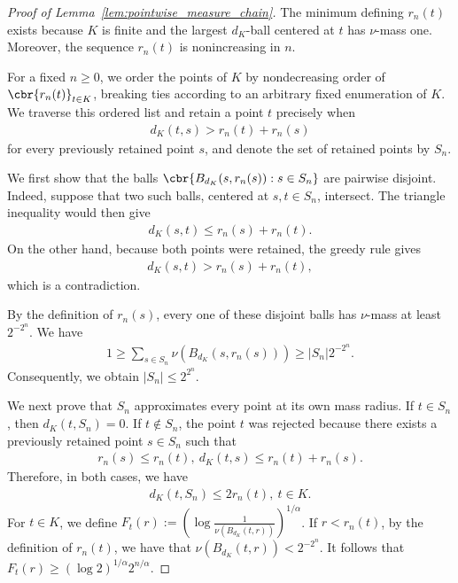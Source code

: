 \documentclass[11pt]{article}
\begin{document}
\begin{proof}[Proof of Lemma~\ref{lem:pointwise_measure_chain}]
The minimum defining $r_n(t)$ exists because $K$ is finite and the
largest $d_K$-ball centered at $t$ has $\nu$-mass one. Moreover, the
sequence $r_n(t)$ is nonincreasing in $n$.

For a fixed $n\ge0$, we order the points of $K$ by nondecreasing order of
$\cbr{r_n(t)}_{t\in K}$, breaking ties according to an arbitrary fixed enumeration of
$K$. We traverse this ordered list and retain a point $t$ precisely
when
\begin{align*}
d_K(t,s)>r_n(t)+r_n(s)
\end{align*}
for every previously retained point $s$, and denote the set of
retained points by $S_n$.

We first show that the balls $\cbr{B_{d_K}(s,r_n(s)):s\in S_n}$ are pairwise disjoint. Indeed, suppose that two such balls, centered at
$s,t\in S_n$, intersect. The triangle inequality would then give
\begin{align*}
d_K(s,t)
\le
r_n(s)+r_n(t).
\end{align*}
On the other hand, because both points were retained, the greedy rule
gives
\begin{align*}
d_K(s,t)>r_n(s)+r_n(t),
\end{align*}
which is a contradiction.

By the definition of $r_n(s)$, every one of these disjoint balls has
$\nu$-mass at least $2^{-2^n}$. We have
\begin{align*}
1\ge
\sum_{s\in S_n}\nu(B_{d_K}(s,r_n(s)))\ge
|S_n|2^{-2^n}.
\end{align*}
Consequently, we obtain $|S_n|\le2^{2^n}$.


We next prove that $S_n$ approximates every point at its own mass
radius. If $t\in S_n$, then $d_K(t,S_n)=0$. If $t\notin S_n$, the
point $t$ was rejected because there exists a previously retained point
$s\in S_n$ such that
\begin{align*}
r_n(s)\le r_n(t),
\ 
d_K(t,s)\le r_n(t)+r_n(s).
\end{align*}
Therefore, in both cases, we have
\begin{align*}
d_K(t,S_n)
\le
2r_n(t),
\ t\in K.
\end{align*}
For $t\in K$, we define
$F_t(r)
:=
\left(
\log\frac{1}{\nu(B_{d_K}(t,r))}
\right)^{1/\alpha}$. If $r<r_n(t)$, by the definition of $r_n(t)$, we have that $\nu(B_{d_K}(t,r))<2^{-2^n}$.
It follows that $F_t(r)
\ge
(\log2)^{1/\alpha}2^{n/\alpha}$.


\end{proof}
\end{document}
